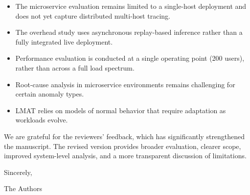 \documentclass[11pt]{article}
\begin{document}
\begin{itemize}[leftmargin=1.5em, itemsep=0.4em]
\item The microservice evaluation remains limited to a single-host deployment and does not yet capture distributed multi-host tracing.
\item The overhead study uses asynchronous replay-based inference rather than a fully integrated live deployment.
\item Performance evaluation is conducted at a single operating point (200 users), rather than across a full load spectrum.
\item Root-cause analysis in microservice environments remains challenging for certain anomaly types.
\item LMAT relies on models of normal behavior that require adaptation as workloads evolve.
\end{itemize}

We are grateful for the reviewers' feedback, which has significantly strengthened the manuscript. The revised version provides broader evaluation, clearer scope, improved system-level analysis, and a more transparent discussion of limitations.

Sincerely,

The Authors
\end{document}
